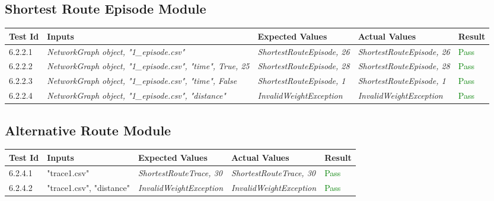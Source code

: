 \documentclass[12pt, titlepage]{article}
\begin{document}
\subsection{Shortest Route Episode Module}
\begin{tabular}{ | m{3.5em} | m{4cm}| m{4cm} | m{4cm} | m{1.2cm} | } 
  \hline
  \textbf{Test Id}& \textbf{Inputs} & \textbf{Expected Values} & \textbf{Actual Values} & \textbf{Result} \\ 
  \hline
  6.2.2.1 & \textit{NetworkGraph object, "1\_episode.csv"} & \textit{ShortestRouteEpisode, 26} & \textit{ShortestRouteEpisode, 26} & \textcolor{green}{Pass} \\ 
  \hline
  6.2.2.2 & \textit{NetworkGraph object, "1\_episode.csv", "time", True, 25} & \textit{ShortestRouteEpisode, 28} & \textit{ShortestRouteEpisode, 28} & \textcolor{green}{Pass} \\
  \hline
  6.2.2.3 & \textit{NetworkGraph object, "1\_episode.csv", "time", False} & \textit{ShortestRouteEpisode, 1} & \textit{ShortestRouteEpisode, 1} & \textcolor{green}{Pass} \\
  \hline
  6.2.2.4 & \textit{NetworkGraph object, "1\_episode.csv", "distance"} & \textit{InvalidWeightException} & \textit{InvalidWeightException} & \textcolor{green}{Pass} \\
  \hline
\end{tabular}
\subsection{Alternative Route Module}
\begin{tabular}{ | m{3.5em} | m{4cm}| m{4cm} | m{4cm} | m{1.2cm} | } 
  \hline
  \textbf{Test Id}& \textbf{Inputs} & \textbf{Expected Values} & \textbf{Actual Values} & \textbf{Result} \\ 
  \hline
  6.2.4.1 & "trace1.csv" & \textit{ShortestRouteTrace, 30} & \textit{ShortestRouteTrace, 30} & \textcolor{green}{Pass} \\ 
  \hline
  6.2.4.2 & "trace1.csv", "distance" & \textit{InvalidWeightException} & \textit{InvalidWeightException} & \textcolor{green}{Pass} \\
  \hline
\end{tabular}
\end{document}

